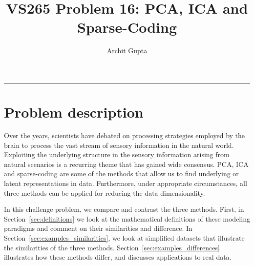 \documentclass[10pt,onecolumn]{article}
\title{VS265 Problem 16: PCA, ICA and Sparse-Coding}
\author{Archit Gupta}
\date{}
\begin{document}
    \maketitle
    \vspace{-2em}
    \noindent\rule{\textwidth}{1.4pt}
    \vspace{1em}
    

    \section{Problem description}
    \label{sec:problem_description}
    Over the years, scientists have debated on processing strategies employed by the brain to process the vast stream of sensory information in the natural world.
    Exploiting the underlying structure in the sensory information arising from natural scenarios is a recurring theme that has gained wide consensus.
    \ac{PCA}, \ac{ICA} and sparse-coding are some of the methods that allow us to find underlying or latent representations in data.
    Furthermore, under appropriate circumstances, all three methods can be applied for reducing the data dimensionality.

    In this challenge problem, we compare and contrast the three methods.
    First, in Section~\ref{sec:definitions} we look at the mathematical definitions of these modeling paradigms and comment on their similarities and difference.
    In Section~\ref{sec:examples_similarities}, we look at simplified datasets that illustrate the similarities of the three methods.
    Section~\ref{sec:examples_differences} illustrates how these methods differ, and discusses applications to real data.
\end{document}
